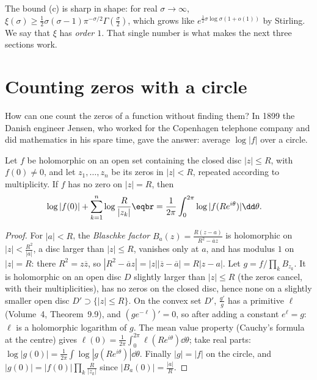 The bound (c) is sharp in shape: for real $\sigma\to\infty$, $\xi(\sigma)\ge\frac12\sigma(\sigma-1)\pi^{-\sigma/2}\Gamma(\frac\sigma2)$, which grows like $e^{\frac12\sigma\log\sigma(1+o(1))}$ by Stirling. We say that
$\xi$ has \emph{order $1$}. That single number is what makes the next three sections work.

\section{Counting zeros with a circle}

How can one count the zeros of a function without finding them? In 1899 the Danish engineer Jensen, who worked for the Copenhagen telephone company and did
mathematics in his spare time, gave the answer: average $\log|f|$ over a circle.

\begin{theorem}\label{thm:jensen}
Let $f$ be holomorphic on an open set containing the closed disc $|z|\le R$, with $f(0)\ne0$, and let $z_1,\dots,z_n$ be its zeros in $|z|<R$, repeated according to multiplicity.
If $f$ has no zero on $|z|=R$, then
\[
\begin{aligned}\log|f(0)|&+\sum_{k=1}^n\log\frac R{|z_k|}\eqbr=\frac1{2\pi}\int_0^{2\pi}\log|f(Re^{i\theta})|\dd\theta.\end{aligned}
\]
\end{theorem}
\begin{proof}
For $|a|<R$, the \emph{Blaschke factor} $B_a(z)=\frac{R(z-a)}{R^2-\overline az}$ is holomorphic on $|z|<\frac{R^2}{|a|}$, a disc larger than $|z|\le R$, vanishes only at $a$, and has modulus $1$ on
$|z|=R$: there $R^2=z\overline z$, so $|R^2-\overline az|=|z||\overline z-\overline a|=R|z-a|$. Let $g=f/\prod_kB_{z_k}$. It is holomorphic on an open disc $D$ slightly larger than $|z|\le R$
(the zeros cancel, with their multiplicities), has no zeros on the closed disc, hence none on a slightly smaller open disc $D'\supset\{|z|\le R\}$. On the convex set $D'$, $\frac{g'}g$ has a
primitive $\ell$ (Volume~4, Theorem~9.9), and $(ge^{-\ell})'=0$, so after adding a constant $e^\ell=g$: $\ell$ is a holomorphic logarithm of $g$. The mean value property (Cauchy's formula at
the centre) gives $\ell(0)=\frac1{2\pi}\int_0^{2\pi}\ell(Re^{i\theta})\dd\theta$; take real parts: $\log|g(0)|=\frac1{2\pi}\int\log|g(Re^{i\theta})|\dd\theta$. Finally $|g|=|f|$ on the circle, and
$|g(0)|=|f(0)|\prod_k\frac R{|z_k|}$ since $|B_a(0)|=\frac{|a|}R$.
\end{proof}

